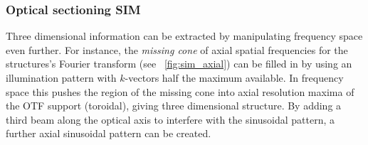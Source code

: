 \subsubsection{Optical sectioning \gls{SIM}}

Three dimensional information can be extracted by manipulating frequency space even further.
For instance, the \emph{\gls{missing cone}} of axial spatial frequencies for the structures's Fourier transform (see \figurename~\ref{fig:sim_axial}) can be filled in by using an illumination pattern with \(k \)-vectors half the maximum available.
In frequency space this pushes the region of the missing cone into axial resolution maxima of the \gls{OTF} support (toroidal), giving three dimensional structure.
By adding a third beam along the optical axis to interfere with the sinusoidal pattern, a further axial sinusoidal pattern can be created.

